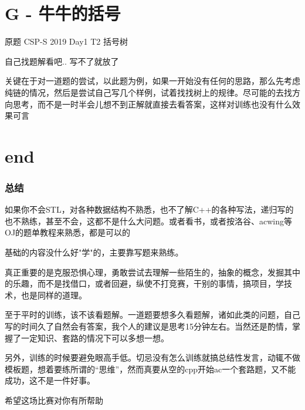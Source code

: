 \documentclass{beamer}
\begin{document}
  \section{G - 牛牛的括号}

  \begin{frame}
    原题 CSP-S 2019 Day1 T2 括号树

    \vspace*{1\baselineskip}
    
    自己找题解看吧.. 写不了就放了
    
    \vspace*{1\baselineskip}

    关键在于对一道题的尝试，以此题为例，如果一开始没有任何的思路，那么先考虑纯链的情况，然后是尝试自己写几个样例，试着找找树上的规律。尽可能的去找方向思考，而不是一时半会儿想不到正解就直接去看答案，这样对训练也没有什么效果可言
  \end{frame}

  \section{end}

  
  \begin{frame}
    \frametitle{总结}
  
      如果你不会STL，对各种数据结构不熟悉，也不了解C++的各种写法，递归写的也不熟练，甚至不会，这都不是什么大问题。或者看书，或者按洛谷、acwing等OJ的题单教程来熟悉，都是可以的
      
      \vspace*{1\baselineskip}

      基础的内容没什么好"学"的，主要靠写题来熟练。

      \vspace*{1\baselineskip}

      真正重要的是克服恐惧心理，勇敢尝试去理解一些陌生的，抽象的概念，发掘其中的乐趣，而不是找借口，或者回避，纵使不打竞赛，干别的事情，搞项目，学技术，也是同样的道理。
  
  \end{frame}

  \begin{frame}
    至于平时的训练，该不该看题解。一道题要想多久看题解，诸如此类的问题，自己写的时间久了自然会有答案，我个人的建议是思考15分钟左右。当然还是酌情，掌握了一定知识、套路的情况下可以多想一想。

    \vspace*{1\baselineskip}
    
    另外，训练的时候要避免眼高手低。切忌没有怎么训练就搞总结性发言，动辄不做模板题，想着要练所谓的“思维”，然而真要从空的cpp开始ac一个套路题，又不能成功，这不是一件好事。
    
    \vspace*{1\baselineskip}

    希望这场比赛对你有所帮助
  \end{frame}
\end{document}
